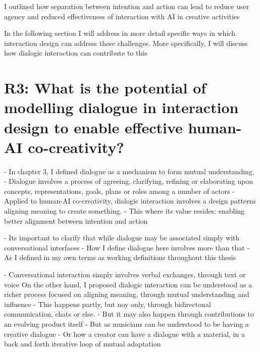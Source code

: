 I outlined how separation between intention and action can lead to reduce user agency and reduced effectiveness of interaction with AI in creative activities

In the following section I will address in more detail specific ways in which interaction design can address these challenges. 
More specifically, I will discuss how dialogic interaction can contribute to this

\section{R3: What is the potential of modelling dialogue in interaction design to enable effective human-AI co-creativity?}


- In chapter 3, I defined dialogue as a mechanism to form mutual understanding.
- Dialogue involves a process of agreeing, clarifying, refining or elaborating upon concepts, representations, goals, plans or roles among a number of actors
- Applied to human-AI co-creativity, dialogic interaction involves a design patterns aligning meaning to create something. 
- This where its value resides: enabling better alignment between intention and action

- Its important to clarify that while dialogue may be associated simply with conversational interfaces
- How I define dialogue here involves more than that
- As I defined in my own terms as working definitions throughout this thesis

- Conversational interaction simply involves verbal exchanges, through text or voice
On the other hand, I proposed dialogic interaction can be understood as a richer process focused on aligning meaning, through mutual understanding and influence
- This happens partly, but noy only, through bidirectonal communication, chats or else. 
- But it may also happen through contributions to an evolving product itself
- But as musicians can be understood to be having a creative dialogue
- Or how a creator can have a dialogue with a material, in a back and forth iterative loop of mutual adaptation

